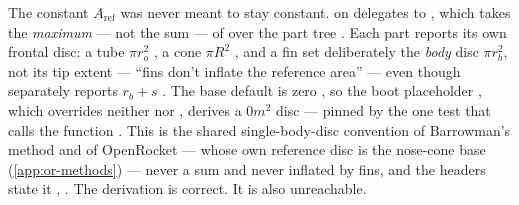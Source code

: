 The constant $A_{\mathrm{ref}}$ was never meant to stay constant.
 on  delegates to
 , which takes the
\emph{maximum} --- not the sum --- of  over the part tree
. Each part reports its own frontal disc: a tube
$\pi r_o^2$ , a cone $\pi R^2$
, and a fin set deliberately the \emph{body} disc
$\pi r_b^2$, not its tip extent --- ``fins don't inflate the reference area''
 --- even though  separately reports
$r_b + s$ . The base default is zero
, so the boot placeholder , which overrides
neither  nor , derives a $0\unit{m^2}$ disc --- pinned
by the one test that calls the function . This is the
shared single-body-disc convention of Barrowman's method and of OpenRocket --- whose own
reference disc is the nose-cone base (\cref{app:or-methods}) --- never a sum and never
inflated by fins, and the headers state it ,
. The derivation is correct. It is also unreachable.

